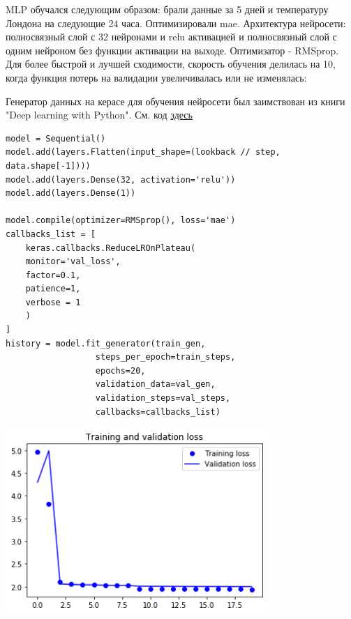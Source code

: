 \documentclass[11pt]{article}
\begin{document}
MLP обучался следующим образом: брали данные за 5 дней и температуру Лондона на следующие 24 часа. Оптимизировали mae.
Архитектура нейросети: полносвязный слой с 32 нейронами и relu активацией и полносвязный слой с одним нейроном без
функции активации на выходе. Оптимизатор - RMSprop. Для более быстрой и лучшей сходимости, скорость обучения делилась
на 10, когда функция потерь на валидации увеличивалась или не изменялась:

Генератор данных на керасе для обучения нейросети был заимствован из книги "Deep learning with Python". См. код \href{https://github.com/fchollet/deep-learning-with-python-notebooks/blob/master/6.3-advanced-usage-of-recurrent-neural-networks.ipynb}{здесь}

\begin{verbatim}
model = Sequential()
model.add(layers.Flatten(input_shape=(lookback // step, data.shape[-1])))
model.add(layers.Dense(32, activation='relu'))
model.add(layers.Dense(1))

model.compile(optimizer=RMSprop(), loss='mae')
callbacks_list = [
    keras.callbacks.ReduceLROnPlateau(
    monitor='val_loss',
    factor=0.1,
    patience=1,
    verbose = 1
    )
]
history = model.fit_generator(train_gen,
			      steps_per_epoch=train_steps,
			      epochs=20,
			      validation_data=val_gen,
			      validation_steps=val_steps,
			      callbacks=callbacks_list)
\end{verbatim}

\begin{center}
\includegraphics[width=10cm]{./pics/mlp_loss.png}
\end{center}
\end{document}
